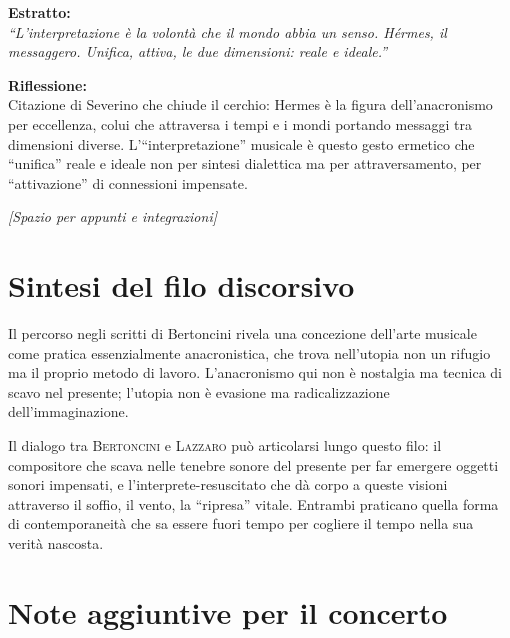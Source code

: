 \documentclass[12pt,a4paper]{article}
\begin{document}
\begin{estratto}
\textbf{Estratto:} \\
\textit{``L'interpretazione è la volontà che il mondo abbia un senso. Hérmes, il messaggero. Unifica, attiva, le due dimensioni: reale e ideale.''}
\end{estratto}

\begin{riflessione}
\textbf{Riflessione:} \\
Citazione di Severino che chiude il cerchio: Hermes è la figura dell'anacronismo per eccellenza, colui che attraversa i tempi e i mondi portando messaggi tra dimensioni diverse. L'``interpretazione'' musicale è questo gesto ermetico che ``unifica'' reale e ideale non per sintesi dialettica ma per attraversamento, per ``attivazione'' di connessioni impensate.

\vspace{0.5cm}
\textit{[Spazio per appunti e integrazioni]}
\vspace{1cm}
\end{riflessione}

\newpage

\section*{Sintesi del filo discorsivo}

Il percorso negli scritti di Bertoncini rivela una concezione dell'arte musicale come pratica essenzialmente anacronistica, che trova nell'utopia non un rifugio ma il proprio metodo di lavoro. L'anacronismo qui non è nostalgia ma tecnica di scavo nel presente; l'utopia non è evasione ma radicalizzazione dell'immaginazione.

Il dialogo tra \textsc{Bertoncini} e \textsc{Lazzaro} può articolarsi lungo questo filo: il compositore che scava nelle tenebre sonore del presente per far emergere oggetti sonori impensati, e l'interprete-resuscitato che dà corpo a queste visioni attraverso il soffio, il vento, la ``ripresa'' vitale. Entrambi praticano quella forma di contemporaneità che sa essere fuori tempo per cogliere il tempo nella sua verità nascosta.

\vspace{2cm}

\section*{Note aggiuntive per il concerto}
\end{document}
